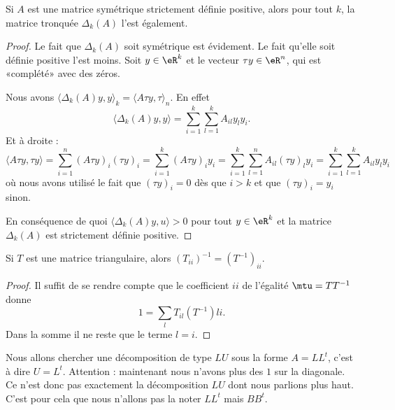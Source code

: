 \begin{lemma}       \label{LEMooVEIYooZbShQb}
    Si \( A\) est une matrice symétrique strictement définie positive, alors pour tout \( k\), la matrice tronquée \( \Delta_k(A)\) l'est également.    
\end{lemma}

\begin{proof}
    Le fait que \( \Delta_k(A)\) soit symétrique est évidement. Le fait qu'elle soit définie positive l'est moins. Soit \( y\in \eR^k\) et le vecteur \( \tau y\in \eR^n\), qui est «complété» avec des zéros.

    Nous avons \( \langle \Delta_k(A)y, y\rangle_k=\langle A\tau y, \tau \rangle_n\). En effet
    \begin{equation}
        \langle \Delta_k(A)y, y\rangle =\sum_{i=1}^k\sum_{l=1}^kA_{il}y_ly_i.
    \end{equation}
    Et à droite :
    \begin{equation}
            \langle A\tau y, \tau y\rangle =\sum_{i=1}^n(A\tau y)_i(\tau y)_i
            =\sum_{i=1}^k(A\tau y)_i y_i
            =\sum_{i=1}^k\sum_{l=1}^n A_{il}(\tau y)_ly_i
            =\sum_{i=1}^k\sum_{l=1}^k A_{il}y_ly_i
    \end{equation}
    où nous avons utilisé le fait que \( (\tau y)_i=0\) dès que \( i>k\) et que \( (\tau y)_i=y_i\) sinon.

    En conséquence de quoi \( \langle \Delta_k(A)y, u\rangle >0\) pour tout \( y\in \eR^k\) et la matrice \( \Delta_k(A)\) est strictement définie positive.
\end{proof}

\begin{lemma}       \label{LEMooLBQLooIYvacH}
    Si \( T\) est une matrice triangulaire, alors \( (T_{ii})^{-1}=(T^{-1})_{ii}\).
\end{lemma}

\begin{proof}
    Il suffit de se rendre compte que le coefficient \( ii\) de l'égalité \( \mtu=TT^{-1}\) donne
    \begin{equation}
        1=\sum_lT_{il}(T^{-1})li.
    \end{equation}
    Dans la somme il ne reste que le terme \( l=i\).
\end{proof}

Nous allons chercher une décomposition de type \( LU\) sous la forme \( A=LL^t\), c'est à dire \( U=L^t\). Attention : maintenant nous n'avons plus des \( 1\) sur la diagonale. Ce n'est donc pas exactement la décomposition \( LU\) dont nous parlions plus haut. C'est pour cela que nous n'allons pas la noter \( LL^t\) mais \( BB^t\).

